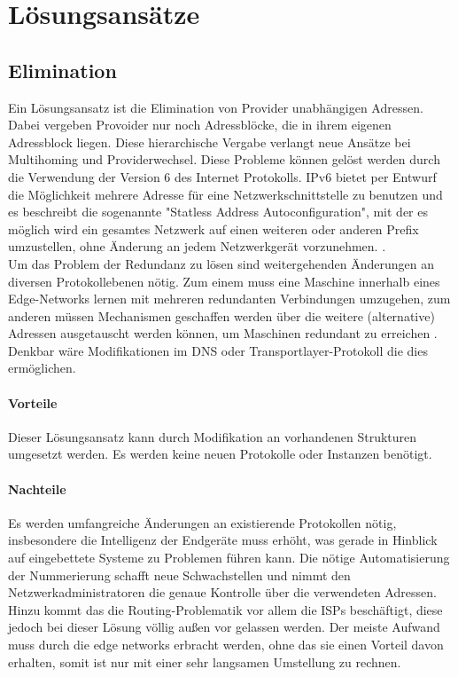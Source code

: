 \section{Lösungsansätze}
\subsection{Elimination}
Ein Lösungsansatz ist die Elimination von Provider unabhängigen Adressen. Dabei vergeben Provoider nur noch Adressblöcke, die in ihrem eigenen Adressblock liegen. Diese hierarchische Vergabe verlangt neue Ansätze bei Multihoming und Providerwechsel. Diese Probleme können gelöst werden durch die Verwendung der Version 6 des Internet Protokolls. IPv6 bietet per Entwurf die Möglichkeit mehrere Adresse für eine Netzwerkschnittstelle zu benutzen und es beschreibt die sogenannte "Statless Address Autoconfiguration", mit der es möglich wird ein gesamtes Netzwerk auf einen weiteren oder anderen Prefix umzustellen, ohne Änderung an jedem Netzwerkgerät vorzunehmen. \cite{RFC4862}. \\ Um das Problem der Redundanz zu lösen sind  weitergehenden Änderungen an diversen Protokollebenen nötig. Zum einem muss eine Maschine innerhalb eines Edge-Networks lernen mit mehreren redundanten Verbindungen umzugehen, zum anderen müssen Mechanismen geschaffen werden über die weitere (alternative) Adressen ausgetauscht werden können, um Maschinen redundant zu erreichen \cite{jen:2008:start}. Denkbar wäre Modifikationen im DNS oder Transportlayer-Protokoll die dies ermöglichen.
\paragraph{Vorteile}
Dieser Lösungsansatz kann durch Modifikation an vorhandenen Strukturen umgesetzt werden. Es werden keine neuen Protokolle oder Instanzen benötigt.
\paragraph{Nachteile} %
Es werden umfangreiche Änderungen an existierende Protokollen nötig, insbesondere die Intelligenz der Endgeräte muss erhöht, was gerade in Hinblick auf eingebettete Systeme zu Problemen führen kann. Die nötige Automatisierung der Nummerierung schafft neue Schwachstellen und nimmt den Netzwerkadministratoren die genaue Kontrolle über die verwendeten Adressen. Hinzu kommt das die Routing-Problematik vor allem die ISPs beschäftigt, diese jedoch bei dieser Lösung völlig außen vor gelassen werden. Der meiste Aufwand muss durch die edge networks erbracht werden, ohne das sie einen Vorteil davon erhalten, somit ist nur mit einer sehr langsamen Umstellung zu rechnen. %

